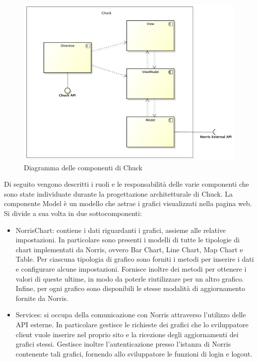 		\begin{figure}[H]\centering
	        \includegraphics[width=\textwidth]{SpecificaTecnica/Pics/ComponentiChuck}
	        \caption{Diagramma delle componenti di Chuck}
	    \end{figure}
	    Di seguito vengono descritti i ruoli e le responsabilità delle varie componenti che sono state individuate durante la progettazione architetturale di Chuck.
			La componente Model è un modello che astrae i grafici visualizzati nella pagina web. Si divide a sua volta in due sottocomponenti:
			\begin{itemize}
				\item NorrisChart: contiene i dati riguardanti i grafici, assieme alle relative impostazioni. In particolare sono presenti i modelli di tutte le tipologie di chart implementati da Norris, ovvero Bar Chart, Line Chart, Map Chart e Table. Per ciascuna tipologia di grafico sono forniti i metodi per inserire i dati e configurare alcune impostazioni. Fornisce inoltre dei metodi per ottenere i valori di queste ultime, in modo da poterle riutilizzare per un altro grafico. Infine, per ogni grafico sono disponibili le stesse modalità di aggiornamento fornite da Norris.
				\item Services: si occupa della comunicazione con Norris attraverso l'utilizzo delle API esterne. In particolare gestisce le richieste dei grafici che lo sviluppatore client vuole inserire nel proprio sito e la ricezione degli aggiornamenti dei grafici stessi. Gestisce inoltre l'autenticazione presso l'istanza di Norris contenente tali grafici, fornendo allo sviluppatore le funzioni di login e logout.
			\end{itemize}

